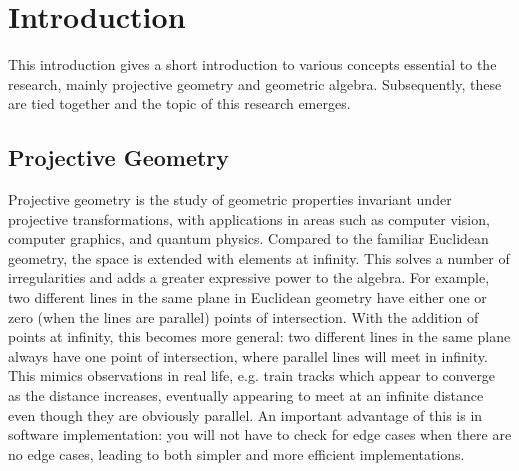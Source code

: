 \documentclass[a4paper, 10pt]{article}
\begin{document}
\tableofcontents
\clearpage

\section{Introduction}
This introduction gives a short introduction to various concepts essential to
the research, mainly projective geometry and geometric algebra. Subsequently,
these are tied together and the topic of this research emerges.

\subsection{Projective Geometry}
Projective geometry is the study of geometric properties invariant under
projective transformations, with applications in areas such as computer vision,
computer graphics, and quantum physics. Compared to the familiar Euclidean
geometry, the space is extended with elements at infinity. This solves a number
of irregularities and adds a greater expressive power to the algebra. For
example, two different lines in the same plane in Euclidean geometry have either
one or zero (when the lines are parallel) points of intersection. With the
addition of points at infinity, this becomes more general: two different lines
in the same plane always have one point of intersection, where parallel lines
will meet in infinity. This mimics observations in real life, e.g. train tracks
which appear to converge as the distance increases, eventually
appearing to meet at an infinite distance even though they are obviously parallel.
An important advantage of this is in software implementation: you will not have
to check for edge cases when there are no edge cases, leading to both simpler
and more efficient implementations.
\end{document}
